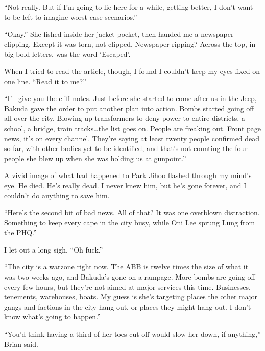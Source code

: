 ``Not really.  But if I'm going to lie here for a while, getting better, I don't want to be left to imagine worst case scenarios.''



``Okay.''  She fished inside her jacket pocket, then handed me a newspaper clipping.  Except it was torn, not clipped.  Newspaper ripping?  Across the top, in big bold letters, was the word `Escaped'.



When I tried to read the article, though, I found I couldn't keep my eyes fixed on one line.  ``Read it to me?''



``I'll give you the cliff notes.  Just before she started to come after us in the Jeep, Bakuda gave the order to put another plan into action.  Bombs started going off all over the city.  Blowing up transformers to deny power to entire districts, a school, a bridge, train tracks\ldots the list goes on.  People are freaking out.  Front page news, it's on every channel.  They're saying at least twenty people confirmed dead so far, with other bodies yet to be identified, and that's not counting the four people she blew up when she was holding us at gunpoint.''



A vivid image of what had happened to Park Jihoo flashed through my mind's eye.  He died.  He's really dead.  I never knew him, but he's gone forever, and I couldn't do anything to save him.



``Here's the second bit of bad news.  All of that?  It was one overblown distraction.  Something to keep every cape in the city busy, while Oni Lee sprung Lung from the PHQ.''



I let out a long sigh.  ``Oh fuck.''



``The city is a warzone right now.  The ABB is twelve times the size of what it was two weeks ago, and Bakuda's gone on a rampage.  More bombs are going off every few hours, but they're not aimed at major services this time.  Businesses, tenements, warehouses, boats.  My guess is she's targeting places the other major gangs and factions in the city hang out, or places they might hang out.  I don't know what's going to happen.''



``You'd think having a third of her toes cut off would slow her down, if anything,'' Brian said.



